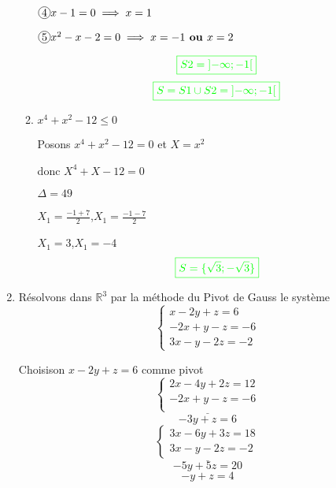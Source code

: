 \documentclass[12pt,a4paper]{article}
\begin{document}
\begin{enumerate}
\begin{enumerate}
\( \encercle{4} x - 1 = 0 \implies x=1\)

\( \encercle{5} x^2 - x - 2 = 0 \implies x=-1 \textbf{ ou } x= 2\)
\begin{flushleft}
\end{flushleft}
\[
\textcolor{green}{\boxed{S2 = \left]-\infty ; -1\right[  }} 
\]
\[
\textcolor{green}{\boxed{S=S1 \cup S2 = \left]-\infty ; -1\right[  }} 
\]
\item $x^4 + x^2 - 12 \leq 0$

Posons $x^4 + x^2 - 12 = 0$ et  $X=x^2$

donc $X^4 + X - 12 = 0$

$\Delta = 49$

$X_{1}=\frac{-1+7}{2}$,$X_{1}=\frac{-1-7}{2}$

$X_{1}=3$,$X_{1}=-4 	$
\[
\textcolor{green}{\boxed{S = \{ \sqrt{3} ; -\sqrt{3} \}   }} 
\]
\end{enumerate}
    \item Résolvons dans $\mathbb{R}^3$ par la méthode du Pivot de Gauss le système
    \[
    \begin{cases}
        x - 2y + z = 6 \\
        -2x + y - z = -6 \\
        3x - y - 2z = -2
    \end{cases}
    \]

Choisison $x - 2y + z = 6$ comme pivot 
    \[
\underline{    \begin{cases}
        2x - 4y + 2z = 12 \\
        -2x + y - z = -6 \\
    \end{cases}}
    \]
    \[-3y+z=6\]
    \[
\underline{    \begin{cases}
        3x - 6y + 3z = 18 \\
        3x - y - 2z = -2 
    \end{cases}}
    \]
    \[-5y+5z=20\]
    \[-y+z=4\]


\end{enumerate}
\end{document}
